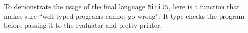 To demonstrate the usage of the final language \lstinline{MiniJS}, here is a function that
makes sure ``well-typed programs cannot go wrong'':
It type checks the program before passing it to the evaluator and pretty
printer.




